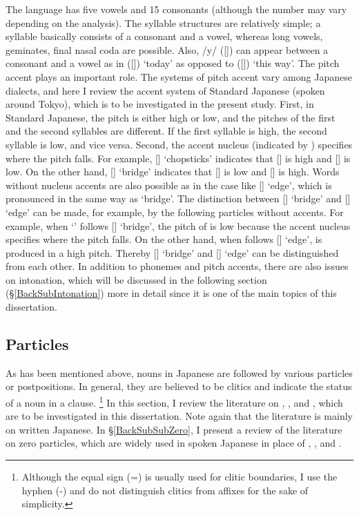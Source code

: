 The language has five vowels and 15 consonants (although the number may vary depending on the analysis).
The syllable structures are relatively simple;
a syllable basically consists of a consonant and a vowel,
whereas long vowels, geminates, final nasal coda are possible.
Also, /y/ ([]) can appear between a consonant and a vowel
as in  ([]) `today' as opposed to  ([]) `this way'.
The pitch accent plays an important role.
The systems of pitch accent vary among Japanese dialects,
and here I review the accent system of Standard Japanese (spoken around Tokyo),
which is to be investigated in the present study.
First, in Standard Japanese,
the pitch is either high or low, and
the pitches of the first and the second syllables are different.
If the first syllable is high, the second syllable is low,
and vice versa.
Second, the accent nucleus (indicated by {\tcorner}) specifies where the pitch falls.
For example,
[] `chopsticks' indicates that [] is high and [] is low.
On the other hand, [] `bridge' indicates that
[] is low and [] is high.
Words without nucleus accents are also possible as in the case like [] `edge',
which is pronounced in the same way as `bridge'.
The distinction between [] `bridge' and [] `edge' can be made, for example, by the following particles without accents.
For example, when  `' follows [] `bridge', the pitch of  is low
because the accent nucleus specifies where the pitch falls.
On the other hand, when  follows [] `edge',  is produced in a high pitch.
Thereby [] `bridge' and [] `edge' can be distinguished from each other.
In addition to phonemes and pitch accents,
there are also issues on intonation, which will be discussed in the following section (\S \ref{BackSubIntonation}) more in detail since it is one of the main topics of this dissertation.


\subsection{Particles}\label{BackSubSecParticles}

As has been mentioned above,
nouns in Japanese are followed by various particles or postpositions.
In general, they are believed to be clitics and indicate the status of a noun in a clause.%
 \footnote{
 Although the equal sign (=) is usually used for clitic boundaries,
 I use the hyphen (-) and do not distinguish clitics from affixes for the sake of simplicity.
 }
In this section, I review the literature on , , and ,
which are to be investigated in this dissertation.
Note again that the literature is mainly on written Japanese.
In \S \ref{BackSubSubZero},
I present a review of the literature on zero particles,
which are widely used in spoken Japanese in place of , , and .

